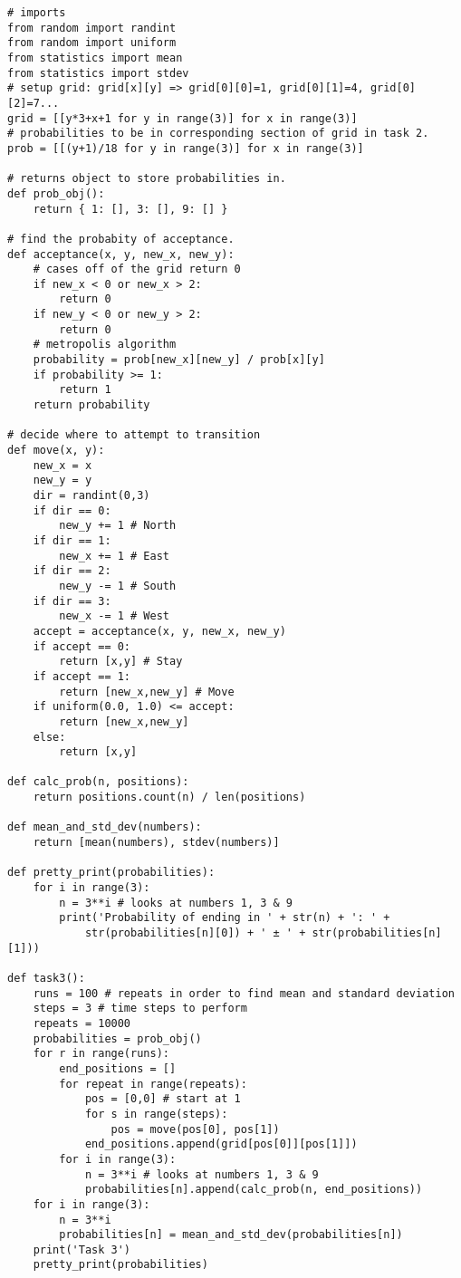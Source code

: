 \documentclass[11pt, a4paper, onecolumn]{article}
\begin{document}
\begin{lstlisting}
# imports
from random import randint
from random import uniform
from statistics import mean
from statistics import stdev
# setup grid: grid[x][y] => grid[0][0]=1, grid[0][1]=4, grid[0][2]=7...
grid = [[y*3+x+1 for y in range(3)] for x in range(3)]
# probabilities to be in corresponding section of grid in task 2.
prob = [[(y+1)/18 for y in range(3)] for x in range(3)]

# returns object to store probabilities in.
def prob_obj():
    return { 1: [], 3: [], 9: [] }

# find the probabity of acceptance.
def acceptance(x, y, new_x, new_y):
    # cases off of the grid return 0
    if new_x < 0 or new_x > 2:
        return 0
    if new_y < 0 or new_y > 2:
        return 0
    # metropolis algorithm
    probability = prob[new_x][new_y] / prob[x][y]
    if probability >= 1:
        return 1
    return probability

# decide where to attempt to transition
def move(x, y):
    new_x = x
    new_y = y
    dir = randint(0,3)
    if dir == 0:
        new_y += 1 # North
    if dir == 1:
        new_x += 1 # East
    if dir == 2:
        new_y -= 1 # South
    if dir == 3:
        new_x -= 1 # West
    accept = acceptance(x, y, new_x, new_y)
    if accept == 0:
        return [x,y] # Stay
    if accept == 1:
        return [new_x,new_y] # Move
    if uniform(0.0, 1.0) <= accept:
        return [new_x,new_y]
    else:
        return [x,y]

def calc_prob(n, positions):
    return positions.count(n) / len(positions)

def mean_and_std_dev(numbers):
    return [mean(numbers), stdev(numbers)]

def pretty_print(probabilities):
    for i in range(3):
        n = 3**i # looks at numbers 1, 3 & 9
        print('Probability of ending in ' + str(n) + ': ' +
            str(probabilities[n][0]) + ' ± ' + str(probabilities[n][1]))

def task3():
    runs = 100 # repeats in order to find mean and standard deviation
    steps = 3 # time steps to perform
    repeats = 10000
    probabilities = prob_obj()
    for r in range(runs):
        end_positions = []
        for repeat in range(repeats):
            pos = [0,0] # start at 1
            for s in range(steps):
                pos = move(pos[0], pos[1])
            end_positions.append(grid[pos[0]][pos[1]])
        for i in range(3):
            n = 3**i # looks at numbers 1, 3 & 9
            probabilities[n].append(calc_prob(n, end_positions))
    for i in range(3):
        n = 3**i
        probabilities[n] = mean_and_std_dev(probabilities[n])
    print('Task 3')
    pretty_print(probabilities)


\end{lstlisting}
\end{document}
